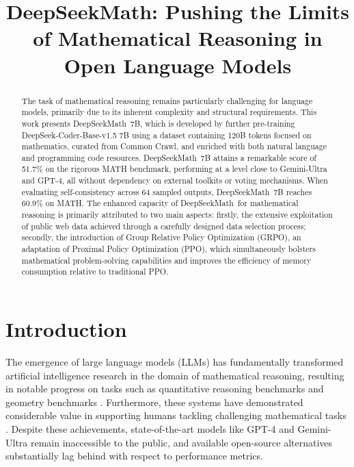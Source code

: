 \title{DeepSeekMath: Pushing the Limits of Mathematical Reasoning in Open Language Models}

\begin{abstract}
The task of mathematical reasoning remains particularly challenging for language models, primarily due to its inherent complexity and structural requirements. This work presents DeepSeekMath~7B, which is developed by further pre-training DeepSeek-Coder-Base-v1.5 7B using a dataset containing 120B tokens focused on mathematics, curated from Common Crawl, and enriched with both natural language and programming code resources. DeepSeekMath~7B attains a remarkable score of 51.7\% on the rigorous MATH benchmark, performing at a level close to Gemini-Ultra and GPT-4, all without dependency on external toolkits or voting mechanisms. When evaluating self-consistency across 64 sampled outputs, DeepSeekMath~7B reaches 60.9\% on MATH. The enhanced capacity of DeepSeekMath~for mathematical reasoning is primarily attributed to two main aspects: firstly, the extensive exploitation of public web data achieved through a carefully designed data selection process; secondly, the introduction of Group Relative Policy Optimization (GRPO), an adaptation of Proximal Policy Optimization (PPO), which simultaneously bolsters mathematical problem-solving capabilities and improves the efficiency of memory consumption relative to traditional PPO.
\end{abstract}

\section{Introduction}

The emergence of large language models (LLMs) has fundamentally transformed artificial intelligence research in the domain of mathematical reasoning, resulting in notable progress on tasks such as quantitative reasoning benchmarks \citep{MATH} and geometry benchmarks \citep{trinh2024solving}. Furthermore, these systems have demonstrated considerable value in supporting humans tackling challenging mathematical tasks \citep{tao}. Despite these achievements, state-of-the-art models like GPT-4 \citep{gpt4} and Gemini-Ultra \citep{gemini} remain inaccessible to the public, and available open-source alternatives substantially lag behind with respect to performance metrics.


